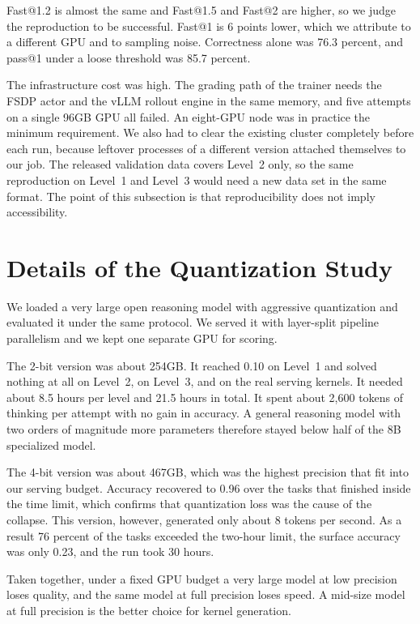 Fast@1.2 is almost the same and Fast@1.5 and Fast@2 are higher, so we judge the reproduction to be
successful. Fast@1 is 6 points lower, which we attribute to a different GPU and to sampling noise.
Correctness alone was 76.3 percent, and pass@1 under a loose threshold was 85.7 percent.

The infrastructure cost was high. The grading path of the trainer needs the FSDP actor and the vLLM
rollout engine in the same memory, and five attempts on a single 96GB GPU all failed. An eight-GPU
node was in practice the minimum requirement. We also had to clear the existing cluster completely
before each run, because leftover processes of a different version attached themselves to our job.
The released validation data covers Level~2 only, so the same reproduction on Level~1 and Level~3
would need a new data set in the same format. The point of this subsection is that reproducibility
does not imply accessibility.

\section{Details of the Quantization Study}

We loaded a very large open reasoning model with aggressive quantization and evaluated it under the
same protocol. We served it with layer-split pipeline parallelism and we kept one separate GPU for
scoring.

The 2-bit version was about 254GB. It reached 0.10 on Level~1 and solved nothing at all on Level~2,
on Level~3, and on the real serving kernels. It needed about 8.5 hours per level and 21.5 hours in
total. It spent about 2{,}600 tokens of thinking per attempt with no gain in accuracy. A general
reasoning model with two orders of magnitude more parameters therefore stayed below half of the 8B
specialized model.

The 4-bit version was about 467GB, which was the highest precision that fit into our serving budget.
Accuracy recovered to 0.96 over the tasks that finished inside the time limit, which confirms that
quantization loss was the cause of the collapse. This version, however, generated only about 8
tokens per second. As a result 76 percent of the tasks exceeded the two-hour limit, the surface
accuracy was only 0.23, and the run took 30 hours.

Taken together, under a fixed GPU budget a very large model at low precision loses quality, and the
same model at full precision loses speed. A mid-size model at full precision is the better choice
for kernel generation.

